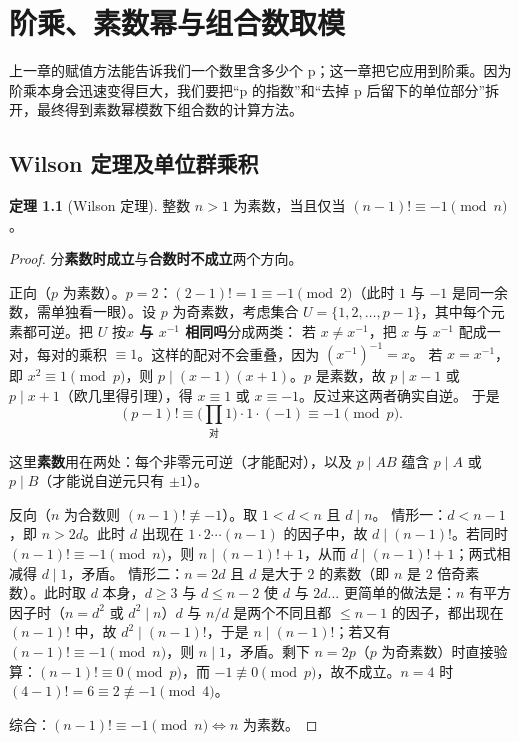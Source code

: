 \documentclass[UTF8,a4paper,11pt,twoside,openright,fontset=fandol]{ctexbook}
\theoremstyle{definition}
\newtheorem{theorem}[definition]{定理}
\begin{document}
\chapter{阶乘、素数幂与组合数取模}
\begin{chapterintro}[章节导读]
上一章的赋值方法能告诉我们一个数里含多少个 p；这一章把它应用到阶乘。因为阶乘本身会迅速变得巨大，我们要把“p 的指数”和“去掉 p 后留下的单位部分”拆开，最终得到素数幂模数下组合数的计算方法。
\end{chapterintro}

\section{Wilson 定理及单位群乘积}
\begin{theorem}[Wilson 定理]
整数 $n>1$ 为素数，当且仅当 $(n-1)!\equiv-1\pmod n$。
\end{theorem}
\begin{proof}
分\textbf{素数时成立}与\textbf{合数时不成立}两个方向。

正向（$p$ 为素数）。$p=2$：$(2-1)!=1\equiv-1\pmod2$（此时 $1$ 与 $-1$ 是同一余数，需单独看一眼）。设 $p$ 为奇素数，考虑集合 $U=\{1,2,\ldots,p-1\}$，其中每个元素都可逆。把 $U$ 按\textbf{$x$ 与 $x^{-1}$ 相同吗}分成两类：
若 $x\ne x^{-1}$，把 $x$ 与 $x^{-1}$ 配成一对，每对的乘积 $\equiv1$。这样的配对不会重叠，因为 $(x^{-1})^{-1}=x$。
若 $x=x^{-1}$，即 $x^2\equiv1\pmod p$，则 $p\mid(x-1)(x+1)$。$p$ 是素数，故 $p\mid x-1$ 或 $p\mid x+1$（欧几里得引理），得 $x\equiv1$ 或 $x\equiv-1$。反过来这两者确实自逆。
于是
\[
 (p-1)!\equiv\Big(\prod_{\text{对}}1\Big)\cdot1\cdot(-1)\equiv-1\pmod p .
\]



这里\textbf{素数}用在两处：每个非零元可逆（才能配对），以及 $p\mid AB$ 蕴含 $p\mid A$ 或 $p\mid B$（才能说自逆元只有 $\pm1$）。

反向（$n$ 为合数则 $(n-1)!\not\equiv-1$）。取 $1<d<n$ 且 $d\mid n$。
情形一：$d<n-1$，即 $n>2d$。此时 $d$ 出现在 $1\cdot2\cdots(n-1)$ 的因子中，故 $d\mid(n-1)!$。若同时 $(n-1)!\equiv-1\pmod n$，则 $n\mid(n-1)!+1$，从而 $d\mid(n-1)!+1$；两式相减得 $d\mid1$，矛盾。
情形二：$n=2d$ 且 $d$ 是大于 $2$ 的素数（即 $n$ 是 $2$ 倍奇素数）。此时取 $d$ 本身，$d\ge3$ 与 $d\le n-2$ 使 $d$ 与 $2d$... 更简单的做法是：$n$ 有平方因子时（$n=d^2$ 或 $d^2\mid n$）$d$ 与 $n/d$ 是两个不同且都 $\le n-1$ 的因子，都出现在 $(n-1)!$ 中，故 $d^2\mid(n-1)!$，于是 $n\mid(n-1)!$；若又有 $(n-1)!\equiv-1\pmod n$，则 $n\mid1$，矛盾。剩下 $n=2p$（$p$ 为奇素数）时直接验算：$(n-1)!\equiv0\pmod p$，而 $-1\not\equiv0\pmod p$，故不成立。$n=4$ 时 $(4-1)!=6\equiv2\not\equiv-1\pmod4$。

综合：$(n-1)!\equiv-1\pmod n\iff n$ 为素数。
\end{proof}
\end{document}

